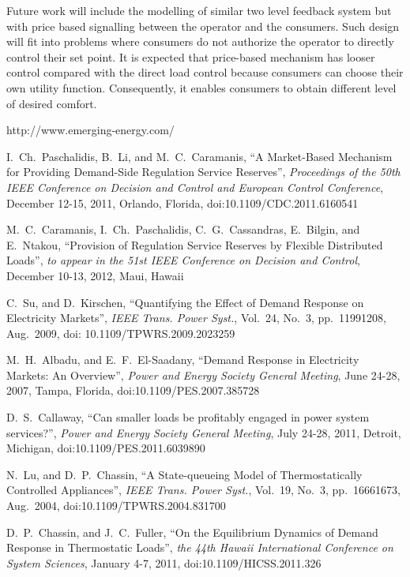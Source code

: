 \documentclass[journal]{IEEEtran}
\begin{document}
Future work will include the modelling of similar two level feedback system but with price based signalling between the operator and the consumers. Such design will fit into problems where consumers do not authorize the operator to directly control their set point. It is expected that price-based mechanism has looser control compared with the direct load control because consumers can choose their own utility function. Consequently, it enables consumers to obtain different level of desired comfort.
\begin{thebibliography}{20}
 http://www.emerging-energy.com/

 I.~Ch.~Paschalidis, B.~Li, and M.~C.~Caramanis, ``A Market-Based Mechanism for Providing Demand-Side Regulation Service Reserves'', \textit{Proceedings of the 50th IEEE Conference on Decision and Control and European Control Conference}, December 12-15, 2011, Orlando, Florida, doi:10.1109/CDC.2011.6160541

 M.~C.~Caramanis, I.~Ch.~Paschalidis, C.~G.~Cassandras, E.~Bilgin, and E.~Ntakou, ``Provision of Regulation Service Reserves by Flexible Distributed Loads'', \textit{to appear in the 51st IEEE Conference on Decision and Control}, December 10-13, 2012, Maui, Hawaii

 C.~Su, and D.~Kirschen, ``Quantifying the Effect of Demand Response on Electricity Markets'', \textit{IEEE Trans. Power Syst.}, Vol.~24, No.~3, pp.~11991208, Aug.~2009, doi: 10.1109/TPWRS.2009.2023259

 M.~H.~Albadu, and E.~F.~El-Saadany, ``Demand Response in Electricity Markets: An Overview'', \textit{Power and Energy Society General Meeting}, June 24-28, 2007, Tampa, Florida, doi:10.1109/PES.2007.385728

 D.~S.~Callaway, ``Can smaller loads be profitably engaged in power system services?'', \textit{Power and Energy Society General Meeting}, July 24-28, 2011, Detroit, Michigan, doi:10.1109/PES.2011.6039890 

 N.~Lu, and D.~P.~Chassin, ``A State-queueing Model of Thermostatically Controlled Appliances'', \textit{IEEE Trans. Power Syst.}, Vol.~19, No.~3, pp.~16661673, Aug.~2004, doi:10.1109/TPWRS.2004.831700 

 D.~P.~Chassin, and J.~C.~Fuller, ``On the Equilibrium Dynamics of Demand Response in Thermostatic Loads'', \textit{the 44th Hawaii International Conference on System Sciences}, January 4-7, 2011, doi:10.1109/HICSS.2011.326 


\end{thebibliography}
\end{document}
